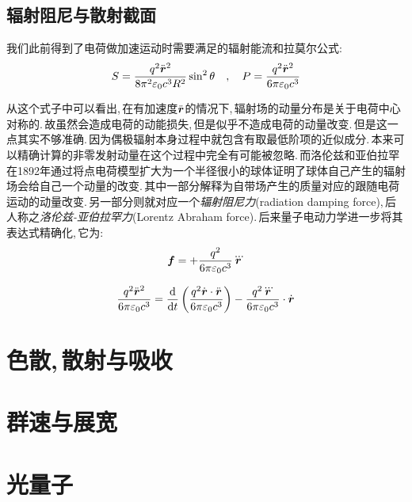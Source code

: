 \subsection{辐射阻尼与散射截面}

我们此前得到了电荷做加速运动时需要满足的辐射能流和拉莫尔公式:
\[S=\frac{q^2\ddot{\boldsymbol{r}}^2}{8\pi^2\varepsilon_0c^3 R^2}\sin^2\theta\quad ,\quad P=\frac{q^2\ddot{\boldsymbol{r}}^2}{6\pi\varepsilon_0c^3}\]

从这个式子中可以看出,\,在有加速度$\ddot{\boldsymbol{r}}$的情况下,\,辐射场的动量分布是关于电荷中心对称的.\,故虽然会造成电荷的动能损失,\,但是似乎不造成电荷的动量改变.\,但是这一点其实不够准确.\,因为偶极辐射本身过程中就包含有取最低阶项的近似成分.\,本来可以精确计算的非零发射动量在这个过程中完全有可能被忽略.\,而洛伦兹和亚伯拉罕在1892年通过将点电荷模型扩大为一个半径很小的球体证明了球体自己产生的辐射场会给自己一个动量的改变.\,其中一部分解释为自带场产生的质量对应的跟随电荷运动的动量改变.\,另一部分则就对应一个\emph{辐射阻尼力}(radiation damping force),\,后人称之\emph{洛伦兹-亚伯拉罕力}(Lorentz Abraham force).\,后来量子电动力学进一步将其表达式精确化,\,它为:
\[\boldsymbol{f}=+\frac{q^2}{6\pi\varepsilon_0c^3}\dddot{\boldsymbol{r}}\]

\[\frac{q^2\ddot{\boldsymbol{r}}^2}{6\pi\varepsilon_0c^3}=\frac{\textrm{d} }{\textrm{d} t}\left(\frac{q^2\dot{\boldsymbol{r}}\cdot \ddot{\boldsymbol{r}}}{6\pi\varepsilon_0c^3}\right)-\frac{q^2\dddot{\boldsymbol{r}}}{6\pi\varepsilon_0c^3}\cdot \dot{\boldsymbol{r}}\]



\section{色散,\,散射与吸收}

\section{群速与展宽}

\section{光量子}

